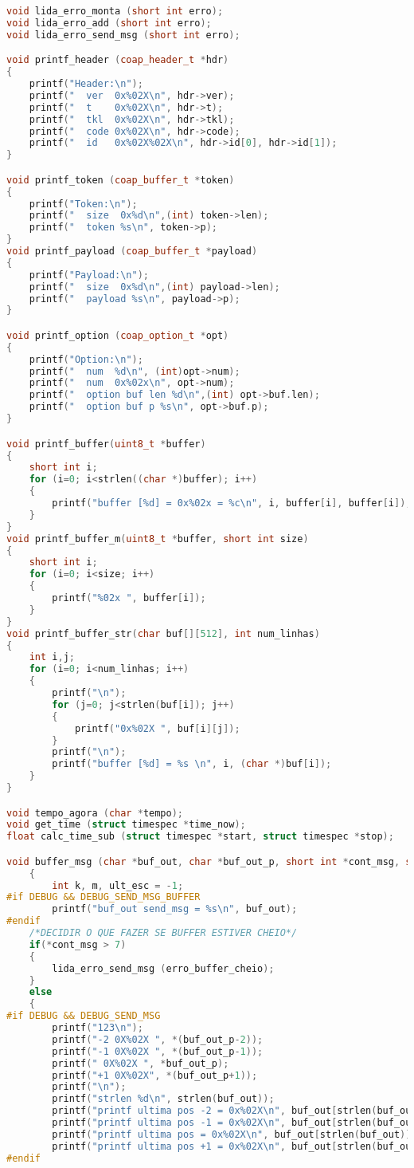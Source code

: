 \begin{lstlisting}[language=C++]
void lida_erro_monta (short int erro);
void lida_erro_add (short int erro);
void lida_erro_send_msg (short int erro);

void printf_header (coap_header_t *hdr)
{
	printf("Header:\n");
	printf("  ver  0x%02X\n", hdr->ver);
	printf("  t    0x%02X\n", hdr->t);
	printf("  tkl  0x%02X\n", hdr->tkl);
	printf("  code 0x%02X\n", hdr->code);
	printf("  id   0x%02X%02X\n", hdr->id[0], hdr->id[1]);
}

void printf_token (coap_buffer_t *token)
{
	printf("Token:\n");
	printf("  size  0x%d\n",(int) token->len);
	printf("  token %s\n", token->p);
}
void printf_payload (coap_buffer_t *payload)
{
	printf("Payload:\n");
	printf("  size  0x%d\n",(int) payload->len);
	printf("  payload %s\n", payload->p);
}

void printf_option (coap_option_t *opt)
{
	printf("Option:\n");
	printf("  num  %d\n", (int)opt->num);
	printf("  num  0x%02x\n", opt->num);
	printf("  option buf len %d\n",(int) opt->buf.len);
	printf("  option buf p %s\n", opt->buf.p);
}

void printf_buffer(uint8_t *buffer)
{
	short int i;
	for (i=0; i<strlen((char *)buffer); i++)
	{
		printf("buffer [%d] = 0x%02x = %c\n", i, buffer[i], buffer[i]);
	}
}
void printf_buffer_m(uint8_t *buffer, short int size)
{
	short int i;
	for (i=0; i<size; i++)
	{
		printf("%02x ", buffer[i]);
	}
}
void printf_buffer_str(char buf[][512], int num_linhas)
{
	int i,j;
	for (i=0; i<num_linhas; i++)
	{		
		printf("\n");
		for (j=0; j<strlen(buf[i]); j++)
		{
			printf("0x%02X ", buf[i][j]);
		}
		printf("\n");
		printf("buffer [%d] = %s \n", i, (char *)buf[i]);
	}
}

void tempo_agora (char *tempo);
void get_time (struct timespec *time_now);
float calc_time_sub (struct timespec *start, struct timespec *stop);

void buffer_msg (char *buf_out, char *buf_out_p, short int *cont_msg, short int *pos, char buf_str[][512])
	{
		int k, m, ult_esc = -1;
#if DEBUG && DEBUG_SEND_MSG_BUFFER
		printf("buf_out send_msg = %s\n", buf_out);
#endif
	/*DECIDIR O QUE FAZER SE BUFFER ESTIVER CHEIO*/
	if(*cont_msg > 7)
	{
		lida_erro_send_msg (erro_buffer_cheio);
	}
	else
	{
#if DEBUG && DEBUG_SEND_MSG
		printf("123\n");
		printf("-2 0X%02X ", *(buf_out_p-2));
		printf("-1 0X%02X ", *(buf_out_p-1));
		printf(" 0X%02X ", *buf_out_p);
		printf("+1 0X%02X", *(buf_out_p+1));
		printf("\n");
		printf("strlen %d\n", strlen(buf_out));
		printf("printf ultima pos -2 = 0x%02X\n", buf_out[strlen(buf_out)-2]);
		printf("printf ultima pos -1 = 0x%02X\n", buf_out[strlen(buf_out)-1]);
		printf("printf ultima pos = 0x%02X\n", buf_out[strlen(buf_out)]);
		printf("printf ultima pos +1 = 0x%02X\n", buf_out[strlen(buf_out)]+1);
#endif
	

\end{lstlisting}
